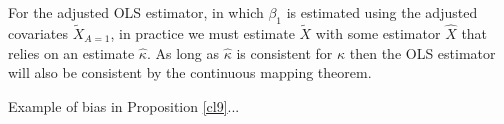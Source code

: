 

\begin{remark}
    For the adjusted OLS estimator, in which $\beta_1$ is estimated using the adjusted covariates $\tilde{X}_{A=1}$, in practice we must estimate $\tilde{X}$ with some estimator $\hat{X}$ that relies on an estimate $\hat{\kappa}$. As long as $\hat{\kappa}$ is consistent for $\kappa$ then the OLS estimator will also be consistent by the continuous mapping theorem.
\end{remark}

\begin{remark}
Example of bias in Proposition \ref{cl9}...

\end{remark}




